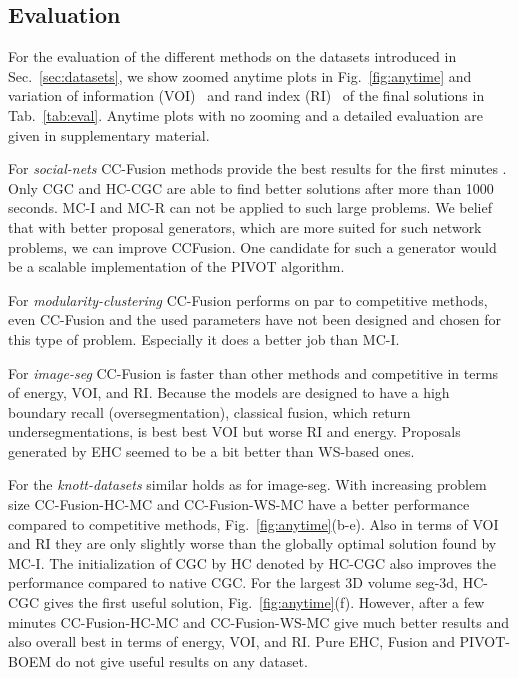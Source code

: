\subsection{Evaluation}
For the evaluation of the different methods on the datasets introduced in Sec.~\ref{sec:datasets},
we show zoomed anytime plots in  Fig.~\ref{fig:anytime} and variation of information (VOI)~\cite{meila-2003}
and rand index (RI)~\cite{rand-1971} of the final solutions in Tab.~\ref{tab:eval}.
Anytime plots with no zooming and a detailed evaluation are given in supplementary material. 


For \emph{social-nets} CC-Fusion methods provide the best results for the first minutes .
Only CGC and HC-CGC are able to find better solutions after more than 1000 seconds.
MC-I and MC-R can not be applied to such large problems.
We belief that with better proposal generators, which are more suited for such network problems,
we can improve CCFusion. One candidate for such a generator would be a scalable implementation of the 
PIVOT algorithm.

For \emph{modularity-clustering} CC-Fusion performs on par to competitive methods, even CC-Fusion 
and the used parameters have not been designed and chosen for this type of problem.
Especially it does a better job than MC-I.

For \emph{image-seg} CC-Fusion is faster than other methods and competitive in terms of energy, VOI, and RI.
Because  the models are designed to have a high boundary recall (oversegmentation), 
classical fusion, which return undersegmentations, is best best VOI but worse RI and energy.
Proposals generated by EHC seemed to be a bit better than WS-based ones.

For the \emph{knott-datasets} similar holds as for image-seg. 
With increasing problem size CC-Fusion-HC-MC and CC-Fusion-WS-MC have a better performance compared to competitive methods, \cf Fig.~\ref{fig:anytime}(b-e).
Also in terms of VOI and RI they are only slightly worse than the globally optimal solution found by MC-I.
The initialization of CGC by HC denoted by HC-CGC also improves the performance compared to native CGC.
For the largest 3D volume seg-3d, HC-CGC gives the first useful solution, \cf  Fig.~\ref{fig:anytime}(f).
However, after a few minutes  CC-Fusion-HC-MC and CC-Fusion-WS-MC give much better results and also overall best in terms of energy, VOI, and RI.
%
Pure EHC, Fusion and PIVOT-BOEM do not give useful results on any dataset.
